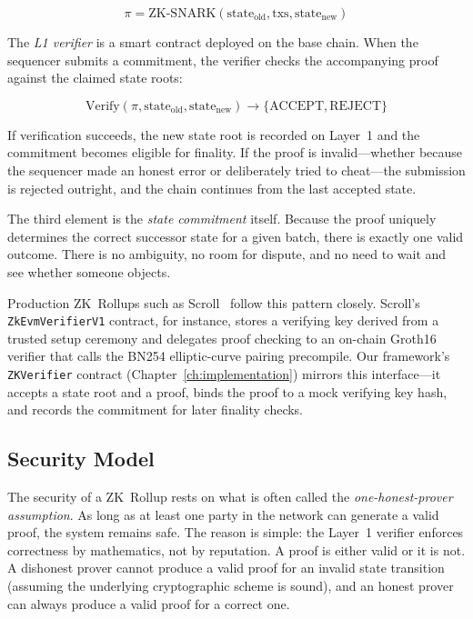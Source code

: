 \begin{equation}
\pi = \text{ZK-SNARK}(\text{state}_{\text{old}}, \text{txs}, \text{state}_{\text{new}})
\end{equation}

The \textit{L1 verifier} is a smart contract deployed on the base chain. When the sequencer submits a commitment, the verifier checks the accompanying proof against the claimed state roots:

\begin{equation}
\text{Verify}(\pi, \text{state}_{\text{old}}, \text{state}_{\text{new}}) \rightarrow \{\text{ACCEPT}, \text{REJECT}\}
\end{equation}

\noindent If verification succeeds, the new state root is recorded on Layer~1 and the commitment becomes eligible for finality. If the proof is invalid---whether because the sequencer made an honest error or deliberately tried to cheat---the submission is rejected outright, and the chain continues from the last accepted state.

The third element is the \textit{state commitment} itself. Because the proof uniquely determines the correct successor state for a given batch, there is exactly one valid outcome. There is no ambiguity, no room for dispute, and no need to wait and see whether someone objects.

Production ZK~Rollups such as Scroll~\cite{zksync-paper} follow this pattern closely. Scroll's \texttt{ZkEvmVerifierV1} contract, for instance, stores a verifying key derived from a trusted setup ceremony and delegates proof checking to an on-chain Groth16 verifier that calls the BN254 elliptic-curve pairing precompile. Our framework's \texttt{ZKVerifier} contract (Chapter~\ref{ch:implementation}) mirrors this interface---it accepts a state root and a proof, binds the proof to a mock verifying key hash, and records the commitment for later finality checks.

\subsection{Security Model}

The security of a ZK~Rollup rests on what is often called the \textit{one-honest-prover assumption}. As long as at least one party in the network can generate a valid proof, the system remains safe. The reason is simple: the Layer~1 verifier enforces correctness by mathematics, not by reputation. A proof is either valid or it is not. A dishonest prover cannot produce a valid proof for an invalid state transition (assuming the underlying cryptographic scheme is sound), and an honest prover can always produce a valid proof for a correct one.

